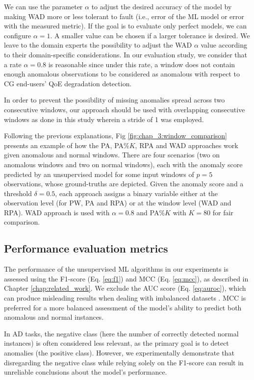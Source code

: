 We can use the parameter $\alpha$ to adjust the desired accuracy of the model by making WAD more or less tolerant to fault (i.e., error of the ML model or error with the measured metric). If the goal is to evaluate only perfect models, we can configure $\alpha = 1$. A smaller value can be chosen if a larger tolerance is desired. We leave to the domain experts the possibility to adjust the WAD $\alpha$ value according to their domain-specific considerations. In our evaluation study, we consider that a rate $\alpha = 0.8$ is reasonable since under this rate, a window does not contain enough anomalous observations to be considered as anomalous with respect to CG end-users' QoE degradation detection.

In order to prevent the possibility of missing anomalies spread across two consecutive windows, our approach should be used with overlapping consecutive windows as done in this study wherein a stride of 1 was employed.

 


Following the previous explanations, Fig \ref{fig:chap_3:window_comparison} presents an example of how the PA, PA$\%K$, RPA and WAD approaches work given anomalous and normal windows. There are four scenarios (two on anomalous windows and two on normal windows), each with the anomaly score predicted by an unsupervised model for some input windows of $p=5$ observations, whose ground-truths are depicted. Given the anomaly score and a threshold $\delta=0.5$, each approach assigns a binary variable either at the observation level (for PW, PA and RPA) or at the window level (WAD and RPA). WAD approach is used with $\alpha=0.8$ and PA$\%K$ with $K=80$ for fair comparison.




\subsection{Performance evaluation metrics}

The performance of the unsupervised ML algorithms in our experiments is assessed using the F1-score (Eq. \ref{eq:f1}) and MCC (Eq. \ref{eq:mcc}), as described in Chapter \ref{chap:related_work}. We exclude the AUC score (Eq. \ref{eq:auroc}), which can produce misleading results when dealing with imbalanced datasets \cite{Saito2015ThePP, Ky2022}. MCC is preferred for a more balanced assessment of the model’s ability to predict both anomalous and normal instances.

In AD tasks, the negative class (here the number of correctly detected normal instances) is often considered less relevant, as the primary goal is to detect anomalies (the positive class). However, we experimentally demonstrate that disregarding the negative class while relying solely on the F1-score can result in unreliable conclusions about the model’s performance.


